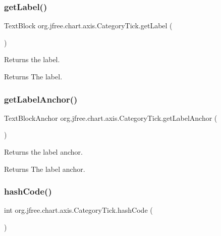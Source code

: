 \subsubsection{\texorpdfstring{get\+Label()}{getLabel()}}
{\footnotesize\ttfamily Text\+Block org.\+jfree.\+chart.\+axis.\+Category\+Tick.\+get\+Label (\begin{DoxyParamCaption}{ }\end{DoxyParamCaption})}

Returns the label.

\begin{DoxyReturn}{Returns}
The label. 
\end{DoxyReturn}
\mbox{\label{classorg_1_1jfree_1_1chart_1_1axis_1_1_category_tick_abca079cdba0d6f35e6ecb2758502ccd6}} 
\subsubsection{\texorpdfstring{get\+Label\+Anchor()}{getLabelAnchor()}}
{\footnotesize\ttfamily Text\+Block\+Anchor org.\+jfree.\+chart.\+axis.\+Category\+Tick.\+get\+Label\+Anchor (\begin{DoxyParamCaption}{ }\end{DoxyParamCaption})}

Returns the label anchor.

\begin{DoxyReturn}{Returns}
The label anchor. 
\end{DoxyReturn}
\mbox{\label{classorg_1_1jfree_1_1chart_1_1axis_1_1_category_tick_a316eccf4be94977eb346a39148c14ddd}} 
\subsubsection{\texorpdfstring{hash\+Code()}{hashCode()}}
{\footnotesize\ttfamily int org.\+jfree.\+chart.\+axis.\+Category\+Tick.\+hash\+Code (\begin{DoxyParamCaption}{ }\end{DoxyParamCaption})}

